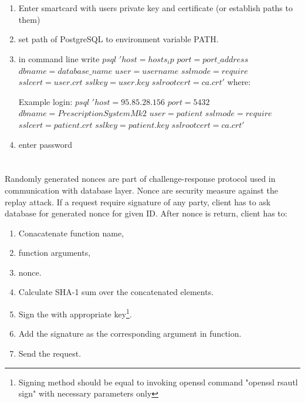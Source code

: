 \section{}\label{sec:login}
\begin{enumerate}
\item Enter smartcard with users private key and certificate (or establish paths to them)
\item set path of PostgreSQL to environment variable PATH.

\item in command line write $psql$ $'host=hosts_ip$ $port=port\_address$ $dbname=database\_name$ $user=username$ $sslmode=require$ $sslcert=user.crt$ $sslkey=user.key$ $sslrootcert=ca.crt'$ where:
	Example login: $psql$ $'host=95.85.28.156$ $port=5432$ $dbname=PrescriptionSystemMk2$ $user=patient$ $sslmode=require$ $sslcert=patient.crt$ $sslkey=patient.key$ $sslrootcert=ca.crt'$
\item enter password
\end{enumerate}

\section{}

Randomly generated nonces are part of challenge-response protocol used in communication with database layer. Nonce are security measure against the replay attack. If a request require signature of any party, client has to ask database for generated nonce for given ID. After nonce is return, client has to:
\begin{enumerate}
 \item Conacatenate function name,
 \item function arguments,
 \item nonce.
 \item Calculate SHA-1 sum over the concatenated elements.
 \item Sign the with appropriate key\footnote{Signing method should be equal to invoking openssl command "openssl rsautl sign" with necessary parameters only}.
 \item Add the signature as the corresponding argument in function.
 \item Send the request.
\end{enumerate}

